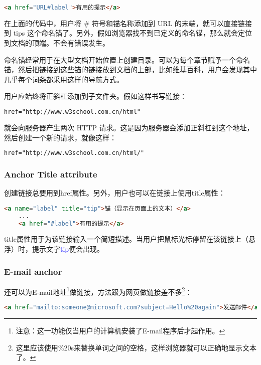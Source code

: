 \begin{lstlisting}[language=HTML]
	<a href="URL#label">有用的提示</a>
\end{lstlisting}

在上面的代码中，用户将 \# 符号和锚名称添加到 URL 的末端，就可以直接链接到 tips 这个命名锚了。另外，假如浏览器找不到已定义的命名锚，那么就会定位到文档的顶端。不会有错误发生。

命名锚经常用于在大型文档开始位置上创建目录。可以为每个章节赋予一个命名锚，然后把链接到这些锚的链接放到文档的上部，比如维基百科，用户会发现其中几乎每个词条都采用这样的导航方式。

用户应始终将正斜杠添加到子文件夹。假如这样书写链接：

\begin{lstlisting}[language=HTML]
	href="http://www.w3school.com.cn/html"
\end{lstlisting}


就会向服务器产生两次 HTTP 请求。这是因为服务器会添加正斜杠到这个地址，然后创建一个新的请求，就像这样：

\begin{lstlisting}[language=HTML]
	href="http://www.w3school.com.cn/html/"
\end{lstlisting}


\subsubsection{Anchor Title attribute}

创建链接总要用到href属性。另外，用户也可以在链接上使用title属性：

\begin{lstlisting}[language=HTML]
	<a name="label" title="tip">锚（显示在页面上的文本）</a>
	...
	<a href="#label">有用的提示</a>
\end{lstlisting}

title属性用于为该链接输入一个简短描述。当用户把鼠标光标停留在该链接上（悬浮）时，提示文字\textcolor{Blue}{tip}便会出现。


\subsubsection{E-mail anchor}

还可以为E-mail地址\footnote{注意：这一功能仅当用户的计算机安装了E-mail程序后才起作用。}做链接，方法跟为网页做链接差不多\footnote{这里应该使用\%20s来替换单词之间的空格，这样浏览器就可以正确地显示文本了。}：

\begin{lstlisting}[language=HTML]
	<a href="mailto:someone@microsoft.com?subject=Hello%20again">发送邮件</a>
\end{lstlisting}

